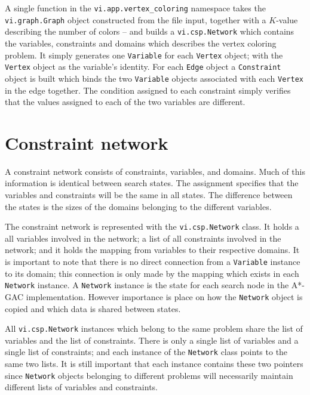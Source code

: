 A single function in the \texttt{vi.app.vertex\_coloring} namespace takes the \texttt{vi.graph.Graph} object constructed from the file input, together with a $K$-value describing the number of colors -- and builds a \texttt{vi.csp.Network} which contains the variables, constraints and domains which describes the vertex coloring problem. It simply generates one \texttt{Variable} for each \texttt{Vertex} object; with the \texttt{Vertex} object as the variable's identity. For each \texttt{Edge} object a \texttt{Constraint} object is built which binds the two \texttt{Variable} objects associated with each \texttt{Vertex} in the edge together. The condition assigned to each constraint simply verifies that the values assigned to each of the two variables are different.

\section*{Constraint network}

A constraint network consists of constraints, variables, and domains. Much of this information is identical between search states. The assignment specifies that the variables and constraints will be the same in all states. The difference between the states is the sizes of the domains belonging to the different variables.

The constraint network is represented with the \texttt{vi.csp.Network} class. It holds a all variables involved in the network; a list of all constraints involved in the network; and it holds the mapping from variables to their respective domains. It is important to note that there is no direct connection from a \texttt{Variable} instance to its domain; this connection is only made by the mapping which exists in each \texttt{Network} instance. A \texttt{Network} instance is the state for each search node in the A*-GAC implementation. However importance is place on how the \texttt{Network} object is copied and which data is shared between states.

All \texttt{vi.csp.Network} instances which belong to the same problem share the list of variables and the list of constraints. There is only a single list of variables and a single list of constraints; and each instance of the \texttt{Network} class points to the same two lists. It is still important that each instance contains these two pointers since \texttt{Network} objects belonging to different problems will necessarily maintain different lists of variables and constraints.

